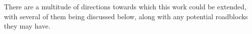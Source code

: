 There are a multitude of directions towards which this work could be extended, with several of them being discussed below, along with any potential roadblocks they may have.

%	
	
%	
	
	
	
	
	
%	
	
	
